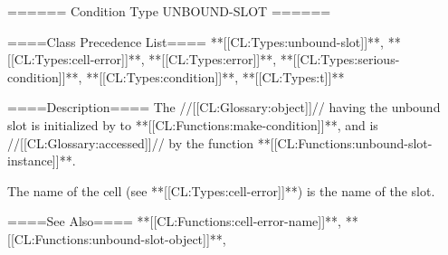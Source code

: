 ====== Condition Type UNBOUND-SLOT ======

====Class Precedence List==== **[[CL:Types:unbound-slot]]**, **[[CL:Types:cell-error]]**, **[[CL:Types:error]]**, **[[CL:Types:serious-condition]]**, **[[CL:Types:condition]]**, **[[CL:Types:t]]**

====Description====
The //[[CL:Glossary:object]]// having the unbound slot is initialized by  to **[[CL:Functions:make-condition]]**, and is //[[CL:Glossary:accessed]]// by the function **[[CL:Functions:unbound-slot-instance]]**.

The name of the cell (see **[[CL:Types:cell-error]]**) is the name of the slot.

====See Also====
**[[CL:Functions:cell-error-name]]**, **[[CL:Functions:unbound-slot-object]]**, {\secref\ConditionSystemConcepts}

